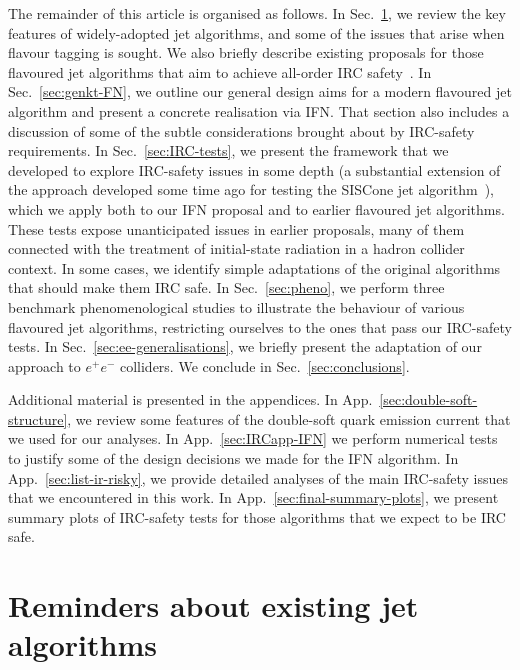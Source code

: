 \documentclass[nofootinbib,twocolumn,preprintnumbers,superscriptaddress,aps]{revtex4-2}
\begin{document}
The remainder of this article is organised as follows.
%
In Sec.~\ref{sec:reminders}, we review the key features of
widely-adopted jet algorithms, and some of the issues that arise when
flavour tagging is sought.
%
We also briefly describe existing proposals for those flavoured jet algorithms that aim to achieve all-order IRC
safety~\cite{Banfi:2006hf,Banfi:2007gu,Czakon:2022wam,Gauld:2022lem}.
%
In Sec.~\ref{sec:genkt-FN}, we outline our general design aims for a
modern flavoured jet algorithm and present a
concrete realisation via IFN.
%
That section also includes a discussion of some of the subtle considerations
brought about by IRC-safety requirements.
%
In Sec.~\ref{sec:IRC-tests}, we present the framework that we
developed to explore IRC-safety issues in some depth (a 
substantial extension of the approach developed some time ago for
testing the SISCone jet algorithm~\cite{Salam:2007xv}), which we apply both to our IFN proposal
and to earlier flavoured jet algorithms.
%
These tests expose unanticipated issues in earlier proposals,
%
many of them connected with the treatment of initial-state radiation
in a hadron collider context.
%
In some cases, we identify simple adaptations of the original
algorithms that should make them IRC safe.
%
In Sec.~\ref{sec:pheno}, we perform three benchmark phenomenological studies
to illustrate the behaviour of various flavoured jet algorithms,
restricting ourselves to the ones that pass our IRC-safety tests. 
%
In Sec.~\ref{sec:ee-generalisations}, we briefly present the
adaptation of our approach to $e^+e^-$ colliders.
%
We conclude in Sec.~\ref{sec:conclusions}.


Additional material is presented in the appendices.
%
In App.~\ref{sec:double-soft-structure},
we review some features of the double-soft quark emission current that we
used for our analyses.
%
In App.~\ref{sec:IRCapp-IFN} we perform numerical tests to justify some of the design decisions we made for the IFN algorithm.
%
In App.~\ref{sec:list-ir-risky}, we provide detailed analyses of the
main IRC-safety issues that we encountered in this work.
%
In App.~\ref{sec:final-summary-plots}, we present summary plots of
IRC-safety tests for those algorithms that we expect to be IRC safe.

\section{Reminders about existing jet algorithms}
\label{sec:reminders}
\end{document}
